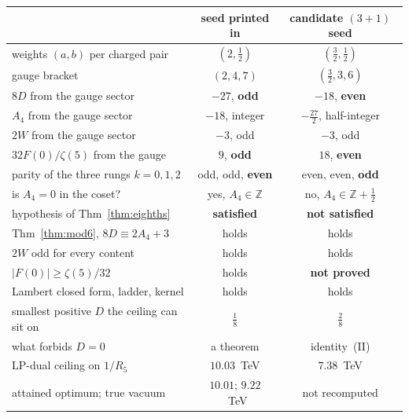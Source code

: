 \documentclass[11pt,a4paper]{article}
\newcommand{\ZZ}{\mathbb{Z}}
\begin{document}
\begin{itemize}
\begin{center}\footnotesize
{}
\begin{tabular}{lcc}
\toprule
\rowcolor{hdrblue!10} & seed printed in \cite{KM25} & candidate $(3{+}1)$ seed \\
\midrule
weights $(a,b)$ per charged pair   & $(2,\tfrac12)$        & $(\tfrac32,\tfrac12)$ \\
gauge bracket                      & $(2,4,7)$             & $(\tfrac32,3,6)$ \\
$8D$ from the gauge sector         & $-27$, \textbf{odd}   & $-18$, \textbf{even} \\
$A_4$ from the gauge sector        & $-18$, integer        & $-\tfrac{27}{2}$, half-integer \\
$2W$ from the gauge sector         & $-3$, odd             & $-3$, odd \\
$32F(0)/\zeta(5)$ from the gauge   & $9$, \textbf{odd}     & $18$, \textbf{even} \\
parity of the three rungs $k=0,1,2$& odd, odd, \textbf{even} & even, even, \textbf{odd} \\
is $A_4=0$ in the coset?           & yes, $A_4\in\ZZ$      & no, $A_4\in\ZZ+\tfrac12$ \\
\midrule
\rowcolor{amber!14}hypothesis of Thm~\ref{thm:eighths}& \textbf{satisfied}    & \textbf{not satisfied} \\
Thm~\ref{thm:mod6}, $8D\equiv2A_4+3$ & holds               & holds \\
$2W$ odd for every content         & holds                 & holds \\
\rowcolor{amber!14}$|F(0)|\ge\zeta(5)/32$             & holds                 & \textbf{not proved} \\
Lambert closed form, ladder, kernel& holds                 & holds \\
\midrule
smallest positive $D$ the ceiling can sit on & $\tfrac18$  & $\tfrac28$ \\
what forbids $D=0$                 & a theorem             & identity~(II) \\
LP-dual ceiling on $1/R_5$         & $10.03$~TeV           & $7.38$~TeV \\
attained optimum; true vacuum      & $10.01$; $9.22$~TeV   & not recomputed \\
\bottomrule
\end{tabular}
\end{center}


\end{itemize}
\end{document}
